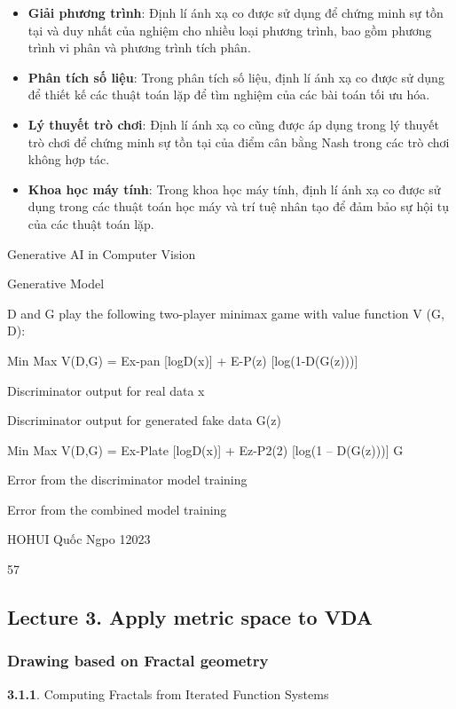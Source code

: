 \begin{itemize}
    \item \textbf{Giải phương trình}: Định lí ánh xạ co được sử dụng để chứng minh sự tồn tại và duy nhất của nghiệm cho nhiều loại phương trình, bao gồm phương trình vi phân và phương trình tích phân.
    \item \textbf{Phân tích số liệu}: Trong phân tích số liệu, định lí ánh xạ co được sử dụng để thiết kế các thuật toán lặp để tìm nghiệm của các bài toán tối ưu hóa.
    \item \textbf{Lý thuyết trò chơi}: Định lí ánh xạ co cũng được áp dụng trong lý thuyết trò chơi để chứng minh sự tồn tại của điểm cân bằng Nash trong các trò chơi không hợp tác.
    \item \textbf{Khoa học máy tính}: Trong khoa học máy tính, định lí ánh xạ co được sử dụng trong các thuật toán học máy và trí tuệ nhân tạo để đảm bảo sự hội tụ của các thuật toán lặp.
\end{itemize}













Generative AI in Computer Vision

Generative Model

D and G play the following two-player minimax game with value function V (G, D):

Min Max V(D,G) = Ex-pan [logD(x)] + E-P(z) [log(1-D(G(z)))]

Discriminator output for real data x

Discriminator output for generated fake data G(z)

Min Max V(D,G) = Ex-Plate [logD(x)] + Ez-P2(2) [log(1 – D(G(z)))] G

Error from the discriminator model training

Error from the combined model training

HOHUI Quốc Ngpo 12023

57





\pagebreak
\subsection{Lecture 3. Apply metric space to VDA}
\subsubsection {Drawing based on Fractal geometry}
\textbf{3.1.1}. Computing Fractals from Iterated Function Systems

